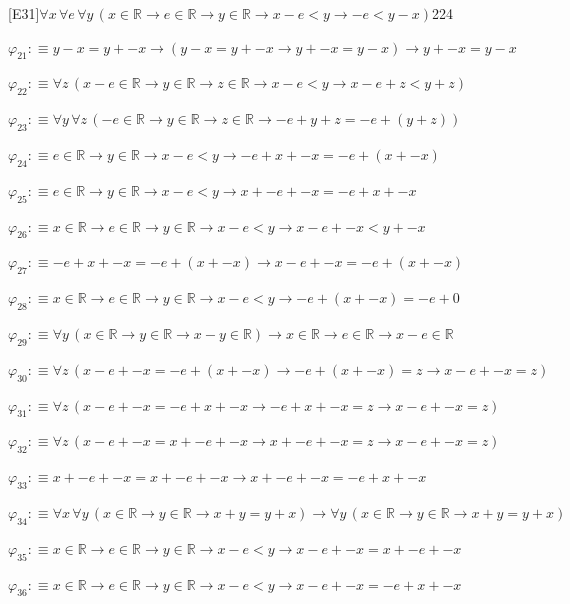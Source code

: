 \begin{fullproof}{[E31]}{$\forall x\,\forall e\,\forall y\,(x \in \mathbb{R} \to e \in \mathbb{R} \to y \in \mathbb{R} \to x - e < y \to -e < y - x)$}{224}
\begin{abbrevlist}
\item $\varphi_{21} :\equiv y - x = y + -x \to (y - x = y + -x \to y + -x = y - x) \to y + -x = y - x$
\item $\varphi_{22} :\equiv \forall z\,(x - e \in \mathbb{R} \to y \in \mathbb{R} \to z \in \mathbb{R} \to x - e < y \to x - e + z < y + z)$
\item $\varphi_{23} :\equiv \forall y\,\forall z\,(-e \in \mathbb{R} \to y \in \mathbb{R} \to z \in \mathbb{R} \to -e + y + z = -e + (y + z))$
\item $\varphi_{24} :\equiv e \in \mathbb{R} \to y \in \mathbb{R} \to x - e < y \to -e + x + -x = -e + (x + -x)$
\item $\varphi_{25} :\equiv e \in \mathbb{R} \to y \in \mathbb{R} \to x - e < y \to x + -e + -x = -e + x + -x$
\item $\varphi_{26} :\equiv x \in \mathbb{R} \to e \in \mathbb{R} \to y \in \mathbb{R} \to x - e < y \to x - e + -x < y + -x$
\item $\varphi_{27} :\equiv -e + x + -x = -e + (x + -x) \to x - e + -x = -e + (x + -x)$
\item $\varphi_{28} :\equiv x \in \mathbb{R} \to e \in \mathbb{R} \to y \in \mathbb{R} \to x - e < y \to -e + (x + -x) = -e + 0$
\item $\varphi_{29} :\equiv \forall y\,(x \in \mathbb{R} \to y \in \mathbb{R} \to x - y \in \mathbb{R}) \to x \in \mathbb{R} \to e \in \mathbb{R} \to x - e \in \mathbb{R}$
\item $\varphi_{30} :\equiv \forall z\,(x - e + -x = -e + (x + -x) \to -e + (x + -x) = z \to x - e + -x = z)$
\item $\varphi_{31} :\equiv \forall z\,(x - e + -x = -e + x + -x \to -e + x + -x = z \to x - e + -x = z)$
\item $\varphi_{32} :\equiv \forall z\,(x - e + -x = x + -e + -x \to x + -e + -x = z \to x - e + -x = z)$
\item $\varphi_{33} :\equiv x + -e + -x = x + -e + -x \to x + -e + -x = -e + x + -x$
\item $\varphi_{34} :\equiv \forall x\,\forall y\,(x \in \mathbb{R} \to y \in \mathbb{R} \to x + y = y + x) \to \forall y\,(x \in \mathbb{R} \to y \in \mathbb{R} \to x + y = y + x)$
\item $\varphi_{35} :\equiv x \in \mathbb{R} \to e \in \mathbb{R} \to y \in \mathbb{R} \to x - e < y \to x - e + -x = x + -e + -x$
\item $\varphi_{36} :\equiv x \in \mathbb{R} \to e \in \mathbb{R} \to y \in \mathbb{R} \to x - e < y \to x - e + -x = -e + x + -x$

\end{abbrevlist}
\end{fullproof}
